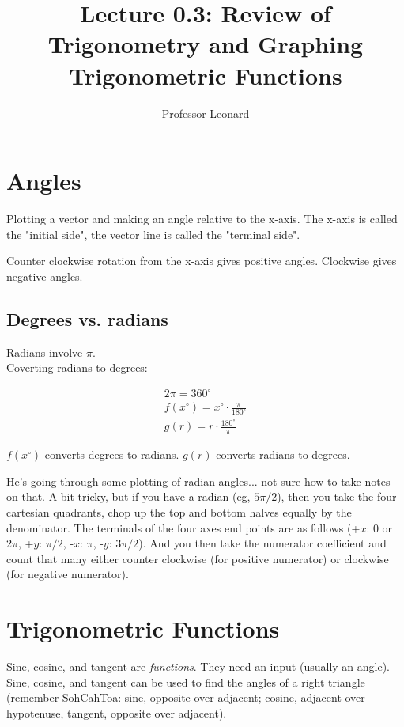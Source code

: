 \documentclass{article}
\begin{document}
\title{Lecture 0.3: Review of Trigonometry and Graphing Trigonometric Functions}
\author{Professor Leonard}
\maketitle

\section{Angles}

Plotting a vector and making an angle relative to the x-axis. The x-axis is called the
"initial side", the vector line is called the "terminal side".

Counter clockwise rotation from the x-axis gives positive angles. Clockwise gives negative
angles.

\subsection{Degrees vs. radians}
Radians involve $\pi$.\\

Coverting radians to degrees: 

\begin{align*}
    2\pi = 360^{\circ}\\
    f(x^{\circ}) = x^{\circ} \cdot \frac{\pi}{180^{\circ}}\\
    g(r) = r \cdot \frac{180^{\circ}}{\pi}
\end{align*}

$f(x^{\circ})$ converts degrees to radians. $g(r)$ converts radians to degrees.

He's going through some plotting of radian angles... not sure how to take notes on that. A
bit tricky, but if you have a radian (eg, $5\pi / 2$), then you take the four cartesian
quadrants, chop up the top and bottom halves equally by the denominator. The terminals of
the four axes end points are as follows (+$x$: 0 or $2\pi$, +$y$: $\pi/2$, -$x$: $\pi$,
-$y$: $3\pi/2$). And you then take the numerator coefficient and count that many either
counter clockwise (for positive numerator) or clockwise (for negative numerator).

\section{Trigonometric Functions}

Sine, cosine, and tangent are \emph{functions}. They need an input (usually an angle).
Sine, cosine, and tangent can be used to find the angles of a right triangle (remember
SohCahToa: sine, opposite over adjacent; cosine, adjacent over hypotenuse, tangent,
opposite over adjacent). \\
\end{document}
